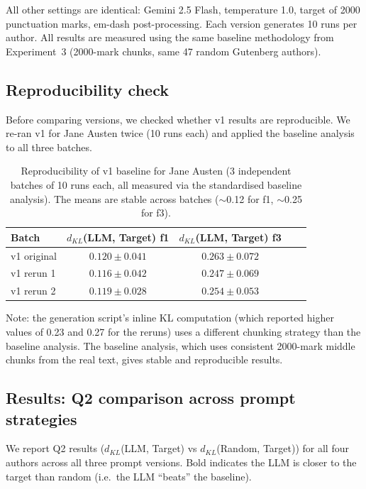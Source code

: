 \documentclass{article}
\begin{document}
All other settings are identical: Gemini 2.5 Flash, temperature 1.0, target of 2000 punctuation marks, em-dash post-processing. Each version generates 10 runs per author. All results are measured using the same baseline methodology from Experiment~3 (2000-mark chunks, same 47 random Gutenberg authors).

\subsection{Reproducibility check}

Before comparing versions, we checked whether v1 results are reproducible. We re-ran v1 for Jane Austen twice (10 runs each) and applied the baseline analysis to all three batches.

\begin{table}[htbp]
\centering
\begin{tabular}{lcccc}
\toprule
Batch & $d_{KL}$(LLM, Target) f1 & $d_{KL}$(LLM, Target) f3 \\
\midrule
v1 original  & $0.120 \pm 0.041$ & $0.263 \pm 0.072$ \\
v1 rerun 1   & $0.116 \pm 0.042$ & $0.247 \pm 0.069$ \\
v1 rerun 2   & $0.119 \pm 0.028$ & $0.254 \pm 0.053$ \\
\bottomrule
\end{tabular}
\caption{Reproducibility of v1 baseline for Jane Austen (3 independent batches of 10 runs each, all measured via the standardised baseline analysis). The means are stable across batches ($\sim$0.12 for f1, $\sim$0.25 for f3).}
\label{tab:reproducibility}
\end{table}

Note: the generation script's inline KL computation (which reported higher values of 0.23 and 0.27 for the reruns) uses a different chunking strategy than the baseline analysis. The baseline analysis, which uses consistent 2000-mark middle chunks from the real text, gives stable and reproducible results.

\subsection{Results: Q2 comparison across prompt strategies}

We report Q2 results ($d_{KL}$(LLM, Target) vs $d_{KL}$(Random, Target)) for all four authors across all three prompt versions. Bold indicates the LLM is closer to the target than random (i.e.\ the LLM ``beats'' the baseline).
\end{document}
